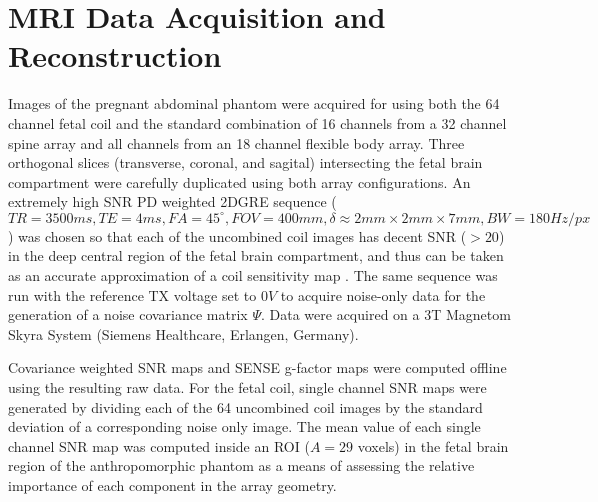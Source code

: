 \section{MRI Data Acquisition and Reconstruction}
Images of the pregnant abdominal phantom were acquired for using both the 64 channel fetal coil and the standard
combination of 16 channels from a 32 channel spine array and all channels from an 18 channel flexible body array. Three
orthogonal slices (transverse, coronal, and sagital) intersecting the fetal brain compartment were carefully duplicated
using both array configurations. An extremely high SNR PD weighted 2DGRE sequence ($TR=3500ms, TE=4ms, FA=45^{\circ},
FOV=400mm, \delta \approx 2mm \times 2mm \times 7mm, BW=180Hz/px$) was chosen so that each of the uncombined coil images
has decent SNR ($>20$) in the deep central region of the fetal brain compartment, and thus can be taken as an accurate
approximation of a coil sensitivity map \cite{Roemer90}. The same sequence was run with the reference TX voltage set to
$0V$ to acquire noise-only data for the generation of a noise covariance matrix $\Psi$. Data were acquired on a 3T
Magnetom Skyra System (Siemens Healthcare, Erlangen, Germany).

Covariance weighted SNR maps and SENSE g-factor maps were computed offline using the resulting raw data. For the fetal
coil, single channel SNR maps were generated by dividing each of the 64 uncombined coil images by the standard deviation
of a corresponding noise only image. The mean value of each single channel SNR map was computed inside an ROI ($A=29$
voxels) in the fetal brain region of the anthropomorphic phantom as a means of assessing the relative importance of each
component in the array geometry.


